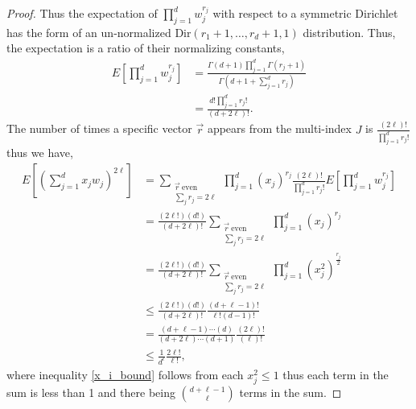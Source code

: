 \documentclass[10pt,a4paper]{amsart}
\begin{document}
\begin{proof}
Thus the expectation of $\prod_{j=1}^{d}w_{j}^{r_{j}}$ with respect to a symmetric Dirichlet has the form of an un-normalized $\text{Dir}(r_{1}+1, \ldots, r_{d}+1, 1)$ distribution. Thus, the expectation is a ratio of their normalizing constants,
\begin{align}
    E[\prod_{j=1}^{d}w_{j}^{r_{j}}]&= \frac{\Gamma(d+1)\prod_{j=1}^{d}\Gamma(r_{j}+1)}{\Gamma(d+1+\sum_{j=1}^{d}r_{j})} \label{dir_exp}\\
    &= \frac{d!\prod_{j=1}^{d}r_{j}!}{(d+2\ell)!}.
\end{align}
The number of times a specific vector $\vec{r}$ appears from the multi-index $J$ is $\frac{(2\ell)!}{\prod_{j=1}^{d}r_{j}!}$ thus we have,
\begin{align}
    E[(\sum_{j=1}^{d}x_{j}w_{j})^{2\ell}]&= \sum_{\substack{\vec{r}~\text{even} \\\sum_{j}r_{j}=2\ell}}\prod_{j=1}^{d}(x_{j})^{r_{j}}\frac{(2\ell)!}{\prod_{j=1}^{d}r_{j}!}E[\prod_{j=1}^{d}w_{j}^{r_{j}}]\\
    &= \frac{(2\ell!)(d!)}{(d+2\ell)!}\sum_{\substack{\vec{r}~\text{even} \\\sum_{j}r_{j}=2\ell}}\prod_{j=1}^{d}(x_{j})^{r_{j}}\\
    &=\frac{(2\ell!)(d!)}{(d+2\ell)!}\sum_{\substack{\vec{r}~\text{even} \\\sum_{j}r_{j}=2\ell}}\prod_{j=1}^{d}(x_{j}^{2})^{\frac{r_{j}}{2}}\\
    &\leq \frac{(2\ell!)(d!)}{(d+2\ell)!} \frac{(d+\ell-1)!}{\ell!(d-1)!} \label{x_i_bound}\\
    &=\frac{(d+\ell-1)\cdots(d)}{(d+2\ell)\cdots(d+1)}\frac{(2\ell)!}{(\ell)!}\\
    &\leq  \frac{1}{d^{\ell}}\frac{2\ell!}{\ell!},
\end{align}
where inequality \eqref{x_i_bound} follows from each $x_{j}^{2} \leq 1$ thus each term in the sum is less than 1 and there being $\binom{d+\ell-1}{\ell}$ terms in the sum.


\end{proof}
\end{document}
